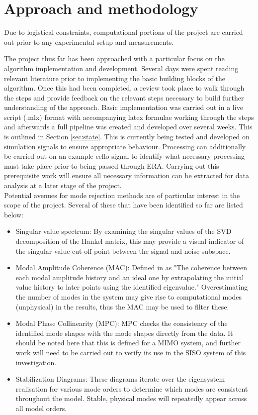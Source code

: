 \section{Approach and methodology}
\label{sec:method}
Due to logistical constraints, computational portions of the project are carried out prior to any experimental setup and measurements.

The project thus far has been approached with a particular focus on the algorithm implementation and development. Several days were spent reading relevant literature prior to implementing the basic building blocks of the algorithm. Once this had been completed, a review took place to walk through the steps and provide feedback on the relevant steps necessary to build further understanding of the approach.
Basic implementation was carried out in a live script (.mlx) format with accompanying latex formulae working through the steps and afterwards a full pipeline was created and developed over several weeks. This is outlined in Section \ref{sec:state}. This is currently being tested and developed on simulation signals to ensure appropriate behaviour. Processing can additionally be carried out on an example cello signal to identify what necessary processing must take place prior to being passed through ERA. Carrying out this prerequisite work will ensure all necessary information can be extracted for data analysis at a later stage of the project. \\
Potential avenues for mode rejection methods are of particular interest in the scope of the project. Several of these that have been identified so far are listed below:

\begin{itemize}
    \item Singular value spectrum: By examining the singular values of the SVD decomposition of the Hankel matrix, this may provide a visual indicator of the singular value cut-off point between the signal and noise subspace.
    \item Modal Amplitude Coherence (MAC): Defined in \cite{era} as "The coherence between each modal amplitude history and an ideal one by extrapolating the initial value history to later points using the identified eigenvalue." Overestimating the number of modes in the system may give rise to computational modes (unphysical) in the results, thus the MAC may be used to filter these.
    \item Modal Phase Collinearity (MPC): MPC checks the consistency of the identified mode shapes with the mode shapes directly from the data. It should be noted here that this is defined for a MIMO system, and further work will need to be carried out to verify its use in the SISO system of this investigation.
    \item Stabilization Diagrams: These diagrams iterate over the eigensystem realisation for various mode orders to determine which modes are consistent throughout the model. Stable, physical modes will repeatedly appear across all model orders.
\end{itemize}


